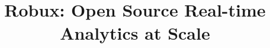 \documentclass{vldb}
\begin{document}

\title{Robux: Open Source Real-time Analytics at Scale}



%
%
%
%

\end{document}
